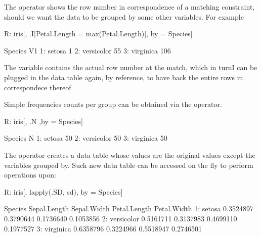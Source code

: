 The  operator shows the row number in 
correspondence of a matching constraint, should we 
want the data to be grouped by some other variables.
For example
\begin{example}
R: iris[, .I[Petal.Length = max(Petal.Length)], 
		by = Species]

      Species  V1
1:     setosa   1
2: versicolor  55
3:  virginica 106
\end{example}
The variable  contains the actual row number 
at the match, which in turnI can be plugged in the data 
table again, by reference, to have back the entire rows 
in correspondece thereof 

Simple frequencies counts per group can be obtained 
via the  operator.
\begin{example}
R: iris[, .N ,by = Species]

      Species  N
1:     setosa 50
2: versicolor 50
3:  virginica 50
\end{example}
The  operator creates a data table whose 
values are the original values except the variables 
grouped by. Such new data table can be accessed on the 
fly to perform operations upon:
\begin{example}
R: iris[, lapply(.SD, sd), by = Species]

      Species Sepal.Length Sepal.Width Petal.Length Petal.Width
1:     setosa    0.3524897   0.3790644    0.1736640   0.1053856
2: versicolor    0.5161711   0.3137983    0.4699110   0.1977527
3:  virginica    0.6358796   0.3224966    0.5518947   0.2746501
\end{example}
\bigskip 

